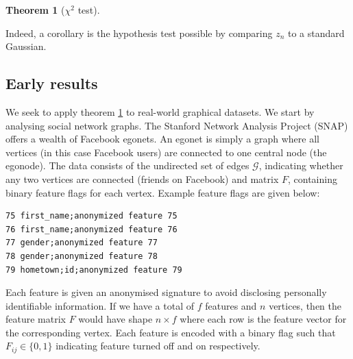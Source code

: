 \documentclass[]{article}
\newcommand{\Gcal}{\mathcal{G}}
\newtheorem{theorem}{Theorem}[section]
\begin{document}
\begin{multicols*}{2}
\begin{theorem}[$\chi^2$ test]
	\label{theorem:hyp-test-sbm-chi}
\end{theorem}

Indeed, a corollary is the hypothesis test possible by comparing $z_n$ to a standard Gaussian.

\subsection{Early results}

We seek to apply theorem \ref{theorem:hyp-test-sbm-chi} to real-world graphical datasets. We start by analysing social network graphs. The Stanford Network Analysis Project (SNAP) \cite{snapnets} offers a wealth of Facebook egonets. An egonet is simply a graph where all vertices (in this case Facebook users) are connected to one central node (the egonode). The data consists of the undirected set of edges $\Gcal$, indicating whether any two vertices are connected (friends on Facebook) and matrix $F$, containing binary feature flags for each vertex. Example feature flags are given below: \\

\begin{center}
\begin{minipage}{8cm}
\begin{Verbatim}[fontsize=\small, frame=single, label={\fbox{Example anonymised feature flags}}]
75 first_name;anonymized feature 75
76 first_name;anonymized feature 76
77 gender;anonymized feature 77
78 gender;anonymized feature 78
79 hometown;id;anonymized feature 79
\end{Verbatim}
\end{minipage}
\end{center}


Each feature is given an anonymised signature to avoid disclosing personally identifiable information. If we have a total of $f$ features and $n$ vertices, then the feature matrix $F$ would have shape $n \times f$ where each row is the feature vector for the corresponding vertex. Each feature is encoded with a binary flag such that $F_{ij} \in \{0, 1\}$ indicating feature turned off and on respectively.


\end{multicols*}
\end{document}
